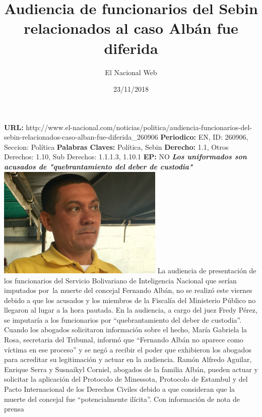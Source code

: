 \documentclass{article}%
\title{\textbf{Audiencia de funcionarios del Sebin relacionados al caso Albán fue diferida}}%
\author{El Nacional Web}%
\date{23/11/2018}%
\begin{document}
%
\normalsize%
\maketitle%
\textbf{URL: }%
http://www.el{-}nacional.com/noticias/politica/audiencia{-}funcionarios{-}del{-}sebin{-}relacionados{-}caso{-}alban{-}fue{-}diferida\_260906\newline%
%
\textbf{Periodico: }%
EN, %
ID: %
260906, %
Seccion: %
Política\newline%
%
\textbf{Palabras Claves: }%
Política, Sebin\newline%
%
\textbf{Derecho: }%
1.1, %
Otros Derechos: %
1.10, %
Sub Derechos: %
1.1.1.3, 1.10.1\newline%
%
\textbf{EP: }%
NO\newline%
\newline%
%
\textbf{\textit{Los uniformados son acusados de "quebrantamiento del deber de custodia"~}}%
\newline%
\newline%
%
\includegraphics[width=300px]{103.jpg}%
\newline%
%
La audiencia de presentación de los funcionarios del Servicio Bolivariano de Inteligencia Nacional que serían imputados por~la muerte del concejal Fernando Albán, no se realizó este viernes debido a que los acusados y los miembros de la Fiscalía del Ministerio Público no llegaron al lugar a la hora pautada.%
\newline%
%
En la audiencia, a cargo del juez Fredy Pérez, se imputaría a los funcionarios por “quebrantamiento del deber de custodia”.%
\newline%
%
Cuando los abogados solicitaron información sobre el hecho, María Gabriela la Rosa, secretaria del Tribunal, informó que “Fernando Albán no aparece como víctima en ese proceso” y se negó a recibir el poder que exhibieron los abogados para acreditar su legitimación y actuar en la audiencia.%
\newline%
%
Ramón Alfredo Aguilar, Enrique Serra y Susnaikyl Corniel, abogados de la familia Albán, pueden actuar y solicitar la aplicación del Protocolo de Minessota, Protocolo de Estambul y del Pacto Internacional de los Derechos Civiles debido a que consideran que la muerte del concejal fue “potencialmente ilícita”.%
\newline%
%
Con información de nota de prensa%
\newline%
%
\end{document}
